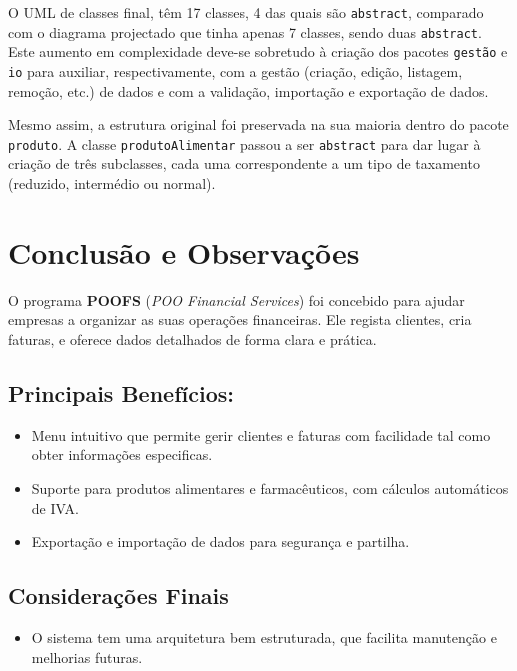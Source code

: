 \documentclass[a4paper, 11pt]{article}
\newcommand\ssection[1]{\section{#1} }
\newcommand\sssection[1]{ \subsection*{\color{MidnightBlue}#1}\vspace{-2ex} }
\begin{document}
O UML de classes final, têm 17 classes, 4 das quais são \texttt{abstract}, comparado com o diagrama projectado que tinha apenas 7 classes, sendo duas \texttt{abstract}. Este aumento em complexidade deve-se sobretudo à criação dos pacotes \texttt{gestão} e \texttt{io} para auxiliar, respectivamente, com a gestão (criação, edição, listagem, remoção, etc.) de dados e com a validação, importação e exportação de dados.

Mesmo assim, a estrutura original foi preservada na sua maioria dentro do pacote \texttt{produto}. A classe \texttt{produtoAlimentar} passou a ser \texttt{abstract} para dar lugar à criação de três subclasses, cada uma correspondente a um tipo de taxamento (reduzido, intermédio ou normal).

\ssection{Conclusão e Observações}

O programa \textbf{POOFS} (\textit{POO Financial Services}) foi concebido para ajudar empresas a organizar as suas operações financeiras. Ele regista clientes, cria faturas, e oferece dados detalhados de forma clara e prática.

\sssection{Principais Benefícios:}
\begin{itemize}
    \setlength\itemsep{0em}
    \item Menu intuitivo que permite gerir clientes e faturas com facilidade tal como obter informações especificas.
    \item Suporte para produtos alimentares e farmacêuticos, com cálculos automáticos de IVA.
    \item Exportação e importação de dados para segurança e partilha.
\end{itemize}

\sssection{Considerações Finais}
\begin{itemize}
    \item O sistema tem uma arquitetura bem estruturada, que facilita manutenção e melhorias futuras.
\end{itemize}




\newpage
\end{document}
